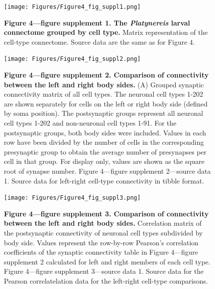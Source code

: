 \documentclass[
  11pt,
]{article}
\begin{document}
\begin{figure}[H]

{\centering \texttt{[image: Figures/Figure4\_fig\_suppl1.png]}

}

\caption{\textbf{Figure 4---figure supplement 1. The \emph{Platynereis}
larval connectome grouped by cell type. } Matrix representation of the
cell-type connectome. Source data are the same as for Figure 4.}

\end{figure}%

\begin{figure}[H]

{\centering \texttt{[image: Figures/Figure4\_fig\_suppl2.png]}

}

\caption{\textbf{Figure 4---figure supplement 2. Comparison of
connectivity between the left and right body sides.} (A) Grouped
synaptic connectivity matrix of all cell types. The neuronal cell types
1-202 are shown separately for cells on the left or right body side
(defined by soma position). The postsynaptic groups represent all
neuronal cell types 1-202 and non-neuronal cell types 1-91. For the
postsynaptic groups, both body sides were included. Values in each row
have been divided by the number of cells in the corresponding
presynaptic group to obtain the average number of presynapses per cell
in that group. For display only, values are shown as the square root of
synapse number. Figure 4---figure supplement 2---source data 1. Source
data for left-right cell-type connectivity in tibble format.}

\end{figure}%

\begin{figure}[H]

{\centering \texttt{[image: Figures/Figure4\_fig\_suppl3.png]}

}

\caption{\textbf{Figure 4---figure supplement 3. Comparison of
connectivity between the left and right body sides.} Correlation matrix
of the postsynaptic connectivity of neuronal cell types subdivided by
body side. Values represent the row-by-row Pearson's correlation
coefficients of the synaptic connectivity table in Figure 4---figure
supplement 2 calculated for left and right members of each cell type.
Figure 4---figure supplement 3---source data 1. Source data for the
Pearson correlatelation data for the left-right cell-type comparisons.}

\end{figure}%
\end{document}
